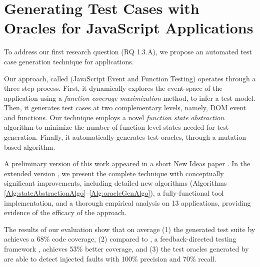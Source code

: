 \chapter{Generating Test Cases with Oracles for JavaScript Applications} \label{Chap:jseft} 
To address our first research question (RQ 1.3.A), we propose an automated test case  generation technique for \javascript applications. 

Our approach, called \jseft (JavaScript Event and Function Testing) operates through a three step process. 
First, it dynamically explores the event-space of the application using a \emph{function coverage maximization} method, to infer a test model. Then, it generates test cases at two complementary levels, namely, DOM event and \javascript functions. Our technique employs a novel \emph{function state abstraction} algorithm to minimize the number of function-level states needed for test generation.
Finally, it automatically generates test oracles, through a mutation-based algorithm.

A preliminary version of this work appeared in a short New Ideas paper \cite{shabnam:ase13}. In the extended version \cite{mirshokraie:icst15}, we present the complete technique with conceptually significant improvements, including detailed new algorithms (Algorithms \ref{Alg:stateAbstractionAlgo}--\ref{Alg:oracleGenAlgo}), a fully-functional tool implementation, and a thorough empirical analysis on 13 \javascript applications, providing evidence of the efficacy of the approach.

%
%
The results of our evaluation show that on average (1) the generated test suite by \jseft achieves a 68\% \javascript code coverage, 
(2) compared to \artemis, a feedback-directed \javascript testing framework \cite{artzi:icse11}, \jseft achieves 53\% better coverage, and (3) the test oracles generated by \jseft are able to detect injected faults with 100\% precision and 70\% recall.

%
%




 




